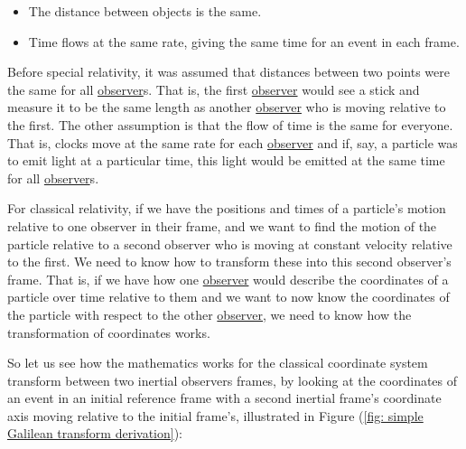 \begin{itemize}
	\item The distance between objects is the same.
	\item Time flows at the same rate, giving the same time for an event in each frame.
\end{itemize}

Before special relativity, it was assumed that distances between two points were the same for all \hyperlink{def-observer}{observer}s.
That is, the first \hyperlink{def-observer}{observer} would see a stick and measure it to be the same length as another \hyperlink{def-observer}{observer} who is moving relative to the first.
The other assumption is that the flow of time is the same for everyone.
That is, clocks move at the same rate for each \hyperlink{def-observer}{observer} and if, say, a particle was to emit light at a particular time, this light would be emitted at the same time for all \hyperlink{def-observer}{observer}s.

For classical relativity, if we have the positions and times of a particle's motion relative to one observer in their frame, and we want to find the motion of the particle relative to a second observer who is moving at constant velocity relative to the first.
We need to know how to transform these into this second observer's frame.
That is, if we have how one \hyperlink{def-observer}{observer} would describe the coordinates of a particle over time relative to them and we want to now know the coordinates of the particle with respect to the other \hyperlink{def-observer}{observer}, we need to know how the transformation of coordinates works.

So let us see how the mathematics works for the classical coordinate system transform between two inertial observers frames, by looking at the coordinates of an event in an initial reference frame with a second inertial frame's coordinate axis moving relative to the initial frame's, illustrated in Figure (\ref{fig: simple Galilean transform derivation}):

